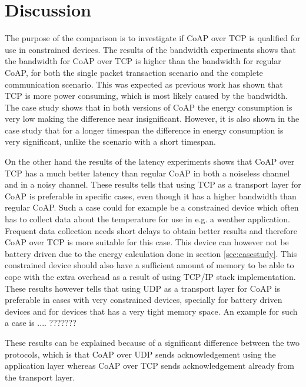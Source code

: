 \section{Discussion}\label{sec:discussion}
The purpose of the comparison is to investigate if CoAP over TCP is qualified for use in constrained devices. The results of the bandwidth experiments shows that the bandwidth for CoAP over TCP is higher than the bandwidth for regular CoAP, for both the single packet transaction scenario and the complete communication scenario. This was expected as previous work has shown that TCP is more power consuming, which is most likely caused by the bandwidth. The case study shows that in both versions of CoAP the energy consumption is very low making the difference near insignificant. However, it is also shown in the case study that for a longer timespan the difference in energy consumption is very significant, unlike the scenario with a short timespan. 

On the other hand the results of the latency experiments shows that CoAP over TCP has a much better latency than regular CoAP in both a noiseless channel and in a noisy channel. 
These results tells that using TCP as a transport layer for CoAP  is preferable in specific cases, even though it has a higher bandwidth than regular CoAP. 
Such a case could for example be a constrained device which often has to collect data about the temperature for use in e.g. a weather application. Frequent data collection needs short delays to obtain better results and therefore CoAP over TCP is more suitable for this case. This device can however not be battery driven due to the energy calculation done in section \ref{sec:casestudy}. This constrained device should also have a sufficient amount of memory to be able to cope with the extra overhead as a result of using TCP/IP stack implementation. 
These results however tells that using UDP as a transport layer for CoAP is preferable in cases with very constrained devices, specially for battery driven devices and for devices that has a very tight memory space. An example for such a case is .... ??????? 

These results can be explained because of a significant difference between the two protocols, which is that CoAP over UDP sends acknowledgement using the application layer whereas CoAP over TCP sends acknowledgement already from the transport layer. 

%
%



	




